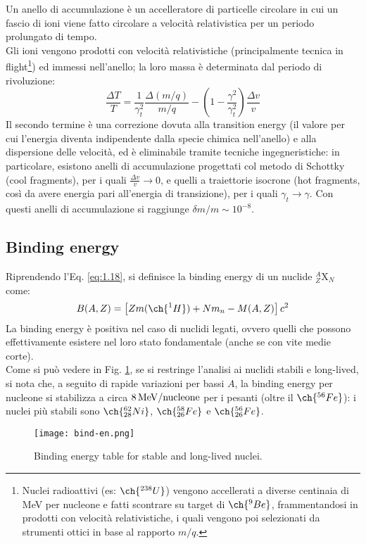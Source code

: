 Un anello di accumulazione è un accelleratore di particelle circolare in cui un fascio di ioni viene fatto circolare a velocità relativistica per un periodo prolungato di tempo.\\
Gli ioni vengono prodotti con velocità relativistiche (principalmente tecnica in flight\footnote{Nuclei radioattivi (es: $ \ch{^{238}U} $) vengono accellerati a diverse centinaia di MeV per nucleone e fatti scontrare su target di $ \ch{^{9}Be} $, frammentandosi in prodotti con velocità relativistiche, i quali vengono poi selezionati da strumenti ottici in base al rapporto $ m/q $.}) ed immessi nell'anello; la loro massa è determinata dal periodo di rivoluzione:
\begin{equation}
	\frac{\Delta T}{T} = \frac{1}{\gamma_t^2}\frac{\Delta (m/q)}{m/q} - \left( 1 - \frac{\gamma^2}{\gamma_t^2} \right) \frac{\Delta v}{v}
	\label{eq:1.24}
\end{equation}
Il secondo termine è una correzione dovuta alla transition energy (il valore per cui l'energia diventa indipendente dalla specie chimica nell'anello) e alla dispersione delle velocità, ed è eliminabile tramite tecniche ingegneristiche: in particolare, esistono anelli di accumulazione progettati col metodo di Schottky (cool fragments), per i quali $ \frac{\Delta v}{v} \rightarrow 0 $, e quelli a traiettorie isocrone (hot fragments, così da avere energia pari all'energia di transizione), per i quali $ \gamma_t \rightarrow \gamma $. Con questi anelli di accumulazione si raggiunge $ \delta m / m \sim 10^{-8} $.

\subsection{Binding energy}

Riprendendo l'Eq. \ref{eq:1.18}, si definisce la binding energy di un nuclide $ ^A_Z \text{X}_N $ come:
\begin{equation}
	B(A,Z) = \left[ Z m({\ch{^{1}H}}) + N m_n - M(A,Z) \right] c^2
	\label{eq:1.25}
\end{equation}
La binding energy è positiva nel caso di nuclidi legati, ovvero quelli che possono effettivamente esistere nel loro stato fondamentale (anche se con vite medie corte).\\
Come si può vedere in Fig. \ref{bind-en}, se si restringe l'analisi ai nuclidi stabili e long-lived, si nota che, a seguito di rapide variazioni per bassi $ A $, la binding energy per nucleone si stabilizza a circa $ 8\,\mathrm{MeV}/\text{nucleone} $ per i pesanti (oltre il $ \ch{^{56}Fe} $): i nuclei più stabili sono $ \ch{^{62}_{28}Ni} $, $ \ch{^{58}_{26}Fe} $ e $ \ch{^{56}_{26}Fe} $.
\begin{figure}[!ht]
	\centering
	\texttt{[image: bind-en.png]}
	\caption{Binding energy table for stable and long-lived nuclei.}
	\label{bind-en}
\end{figure}

